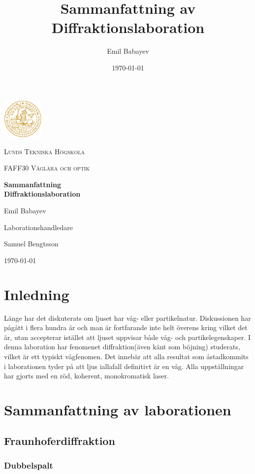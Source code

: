 \documentclass[a4paper]{article}
\title{Sammanfattning av Diffraktionslaboration}
\author{Emil Babayev}
\date{\today}
\begin{document}
\begin{titlepage}
	\centering
	\includegraphics[width=0.15\textwidth]{logo.png}\par\vspace{1cm}
	{\scshape\large Lunds Tekniska Högskola \par}
	\vspace{1cm}
    {\scshape\large FAFF30 Våglära och optik\par}
	\vspace{1.5cm}
	{\huge\bfseries Sammanfattning\\Diffraktionslaboration\par}
	\vspace{2cm}
	{\Large Emil Babayev\par}
	\vfill
	Laborationshandledare\par
    Samuel Bengtsson

    \vfill
    
	{\large \today \par}
\end{titlepage}

\section{Inledning}
Länge har det diskuterats om ljuset har våg- eller partikelnatur. Diskussionen har pågått i flera hundra år och man är fortfarande inte helt överens kring vilket det är,
utan accepterar istället att ljuset uppvisar både våg- och partikelegenskaper. I denna laboration har fenomenet diffraktion(även känt som böjning) studerats, vilket är 
ett typiskt vågfenomen. Det innebär att alla resultat som åstadkommits i laborationen tyder på att ljus iallafall definitivt är en våg. Alla uppställningar har gjorts med en
röd, koherent, monokromatisk laser.

\section{Sammanfattning av laborationen}
\subsection{Fraunhoferdiffraktion}
\subsubsection{Dubbelspalt}
\end{document}

